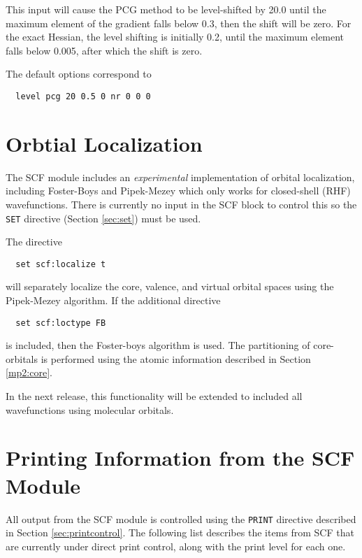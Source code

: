 This input will cause the PCG method to be level-shifted by 20.0 until
the maximum element of the gradient falls below 0.3, then the shift
will be zero.  For the exact Hessian, the level shifting is initially
0.2, until the maximum element falls below 0.005, after which the
shift is zero. 

The default options correspond to
\begin{verbatim}
  level pcg 20 0.5 0 nr 0 0 0
\end{verbatim}

\section{Orbtial Localization}
\label{orbloc}
The SCF module includes an {\em experimental} implementation of
orbital localization, including Foster-Boys and Pipek-Mezey which only
works for closed-shell (RHF) wavefunctions. There is currently no
input in the SCF block to control this so the \verb+SET+ directive
(Section \ref{sec:set}) must be used.

The directive
\begin{verbatim}
  set scf:localize t
\end{verbatim}
will separately localize the core, valence, and virtual orbital spaces
using the Pipek-Mezey algorithm.  If the additional directive
\begin{verbatim}
  set scf:loctype FB
\end{verbatim}
is included, then the Foster-boys algorithm is used.  The partitioning
of core-orbitals is performed using the atomic information described
in Section \ref{mp2:core}.

In the next release, this functionality will be extended to included all
wavefunctions using molecular orbitals.


\newpage
\section{Printing Information from the SCF Module}
\label{sec:scfprint}

All output from the SCF module is controlled using the \verb+PRINT+
directive described in Section \ref{sec:printcontrol}.  The following 
list describes the items from SCF that are currently under direct 
print control, along with the print level for each one.

